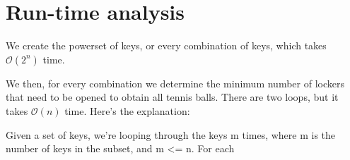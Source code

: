 \documentclass{article}
\begin{document}
\section*{Run-time analysis}
We create the powerset of keys, or every combination of keys, which takes
$\mathcal{O}(2^n)$ time.

We then, for every combination we determine the minimum number of lockers
that need to be opened to obtain all tennis balls. There are two loops, but
it takes $\mathcal{O}(n)$ time. Here's the explanation:

Given a set of keys, we're looping through the keys m times, where m is the
number of keys in the subset, and m <= n. For each
\end{document}
